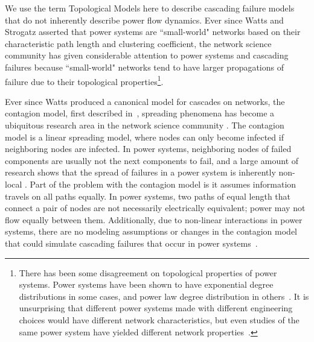 We use the term Topological Models here to describe cascading failure models that do not inherently describe power flow dynamics.  Ever since Watts and Strogatz \cite{watts} asserted that power systems are ``small-world" networks based on their characteristic path length and clustering coefficient, the network science community has given considerable attention to power systems and cascading failures because ``small-world" networks tend to have larger propagations of failure due to their topological properties\footnote{There has been some disagreement on topological properties of power systems.  Power systems have been shown to have exponential degree distributions in some cases, and power law degree distribution in others~\cite{albert}\cite{chassin}.  It is unsurprising that different power systems made with different engineering choices would have different network characteristics, but even studies of the same power system have yielded different network properties~\cite{top_ps_hines}\cite{watts}.}. 

Ever since Watts produced a canonical model for cascades on networks, the contagion model, first described in~\cite{watts_contagion}, spreading phenomena has become a ubiquitous research area in the network science community \cite{market_social_net}\cite{newman_virus}\cite{spread_financ}.  The contagion model is a linear spreading model, where nodes can only become infected if neighboring nodes are infected.  In power systems, neighboring nodes of failed components are usually not the next components to fail, and a large amount of research shows that the spread of failures in a power system is inherently non-local \cite{hines_ig}\cite{Witthaut2015}.  Part of the problem with the contagion model is it assumes information travels on all paths equally. In power systems, two paths of equal length that connect a pair of nodes are not necessarily electrically equivalent; power may not flow equally between them.  Additionally, due to non-linear interactions in power systems, there are no modeling assumptions or changes in the contagion model that could simulate cascading failures that occur in power systems~\cite{model_assump}.  

